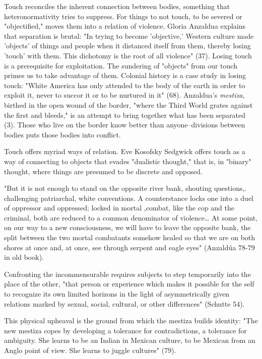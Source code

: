 \documentclass[11pt]{article}
\begin{document}
Touch reconciles the inherent connection between bodies, something
that heteronormativity tries to suppress. For things to not touch, to
be severed or "objectified," moves them into a relation of
violence. Gloria Anzaldua explains that separation is brutal: "In
trying to become 'objective,' Western culture made 'objects' of things
and people when it distanced itself from them, thereby losing 'touch'
with them. This dichotomy is the root of all violence" (37). Losing
touch is a prerequisite for exploitation. The sundering of "objects"
from our touch primes us to take advantage of them. Colonial history
is a case study in losing touch: "White America has only attended to
the body of the earth in order to exploit it, never to succor it or to
be nurtured in it" (68). Anzaldua's \emph{mestiza}, birthed in the open
wound of the border, "where the Third World grates against the first
and bleeds," is an attempt to bring together what has been separated
(3). Those who live on the border know better than anyone--divisions
between bodies puts those bodies into conflict.

Touch offers myriad ways of relation. Eve Kosofsky Sedgwick offers
touch as a way of connecting to objects that evades "dualistic
thought," that is, in "binary" thought, where things are presumed to
be discrete and opposed. 

"But it is not enough to stand on the opposite river bank, shouting
questions,. challenging patriarchal, white conventions.  A
counterstance locks one into a duel of oppressor and oppressed; locked
in mortal ,combat, like the cop and the criminal, both are reduced to
a common denominator of violence\ldots{} At some point, on our way to a new
consciousness, we will have to leave the opposite bank, the split
between the two mortal combatants somehow healed so that we are on
both shores at once and, at once, see through serpent and eagle eyes"
(Anzaldúa 78-79 in old book).

Confronting the incommensurable requires subjects to step temporarily
into the place of the other, "that person or experience which makes it
possible for the self to recognize its own limited horizons in the
light of asymmetrically given relations marked by sexual, social,
cultural, or other differences" (Schutte 54).

This physical upheaval is the ground from which the mestiza builds
identity: "The new mestiza copes by developing a tolerance for
contradictions, a tolerance for ambiguity. She learns to be an Indian
in Mexican culture, to be Mexican from an Anglo point of view. She
learns to juggle cultures" (79).
\end{document}
